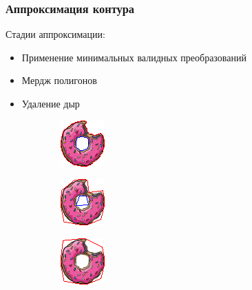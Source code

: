 \documentclass[10pt, unicode]{beamer}
\begin{document}
    \begin{frame}
        \frametitle{Аппроксимация контура}
        Стадии аппроксимации:
        \begin{itemize}
            \item Применение минимальных валидных преобразований
            \item Мердж полигонов
            \item Удаление дыр
        \end{itemize}
        \begin{figure}[H]
            \centering
            \begin{subfigure}[l]{0.33\linewidth}
                \centering
                \includegraphics[scale=1.5]{donutpixel_approx_start.png}
            \end{subfigure}
            \begin{subfigure}{0.33\linewidth}
                \centering
                \includegraphics[scale=1.5]{donutpixel_approx_mid.png}
            \end{subfigure}\begin{subfigure}{0.33\linewidth}
                \centering
                \includegraphics[scale=1.5]{donutpixel_approx_end.png}
            \end{subfigure}
        \end{figure}
    \end{frame}
\end{document}
